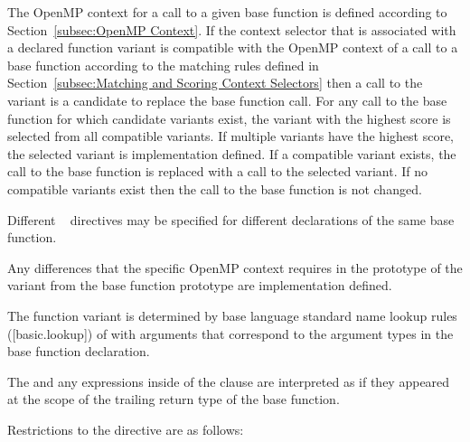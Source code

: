 The OpenMP context for a call to a given base function is defined according 
to Section~\ref{subsec:OpenMP Context}. If the context selector that is 
associated with a declared function variant is compatible with the OpenMP 
context of a call to a base function according to the matching rules defined in
Section~\ref{subsec:Matching and Scoring Context Selectors} then a call to
the variant is a candidate to replace the base function call. For any call
to the base function for which candidate variants exist, the variant with 
the highest score is selected from all compatible variants. If multiple 
variants have the highest score, the selected variant is implementation 
defined. If a compatible variant exists, the call to the base function is 
replaced with a call to the selected variant. If no compatible variants 
exist then the call to the base function is not changed.

Different ~ directives may be specified for
different declarations of the same base function.

Any differences that the specific OpenMP context requires in the prototype 
of the variant from the base function prototype are implementation defined.

\begin{cppspecific}
The function variant is determined by base language standard name lookup
rules ([basic.lookup]) of  with arguments that correspond
to the argument types in the base function declaration.

The  and any expressions inside of the 
clause are interpreted as if they appeared at the scope of the trailing return
type of the base function.
\end{cppspecific}

\restrictions
Restrictions to the  directive are as follows:

